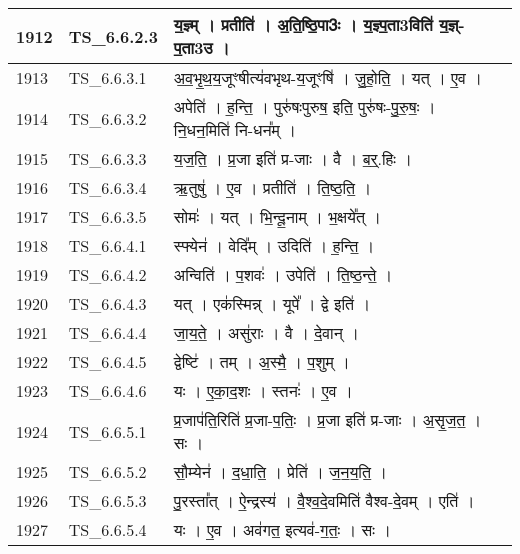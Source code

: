 \documentclass[17pt]{extarticle}
\begin{document}
\begin{longtable}{||p{0.4in}||p{0.9in}||p{4.0in}||p{0.9in}||}
        \hline
            1912 & TS\_6.6.2.3 & य॒ज्ञ्म्   ।   प्रतीति॑   ।   अ॒ति॒ष्ठि॒पा3ः   ।   य॒ज्ञ्प॒ता3विति॑ य॒ज्ञ्{-}प॒ता3उ   ।    &      \\
        \hline
            1913 & TS\_6.6.3.1 & अ॒व॒भृ॒थ॒य॒जूꣳषीत्य॑वभृथ{-}य॒जूꣳषि॑   ।   जु॒हो॒ति॒   ।   यत्   ।   ए॒व   ।    &      \\
        \hline
            1914 & TS\_6.6.3.2 & अपेति॑   ।   ह॒न्ति॒   ।   पुरु॑षःपुरुष॒ इति॒ पुरु॑षः{-}पु॒रु॒षः॒   ।   नि॒धन॒मिति॑ नि{-}धन᳚म्   ।    &      \\
        \hline
            1915 & TS\_6.6.3.3 & य॒ज॒ति॒   ।   प्र॒जा इति॑ प्र{-}जाः   ।   वै   ।   ब॒र्॒.हिः   ।    &      \\
        \hline
            1916 & TS\_6.6.3.4 & ऋ॒तुषु॑   ।   ए॒व   ।   प्रतीति॑   ।   ति॒ष्ठ॒ति॒   ।    &      \\
        \hline
            1917 & TS\_6.6.3.5 & सोमः॑   ।   यत्   ।   भि॒न्दू॒नाम्   ।   भ॒क्षये᳚त्   ।    &      \\
        \hline
            1918 & TS\_6.6.4.1 & स्फ्येन॑   ।   वेदि᳚म्   ।   उदिति॑   ।   ह॒न्ति॒   ।    &      \\
        \hline
            1919 & TS\_6.6.4.2 & अन्विति॑   ।   प॒शवः॑   ।   उपेति॑   ।   ति॒ष्ठ॒न्ते॒   ।    &      \\
        \hline
            1920 & TS\_6.6.4.3 & यत्   ।   एक॑स्मिन्न्   ।   यूपे᳚   ।   द्वे इति॑   ।    &      \\
        \hline
            1921 & TS\_6.6.4.4 & जा॒य॒ते॒   ।   असु॑राः   ।   वै   ।   दे॒वान्   ।    &      \\
        \hline
            1922 & TS\_6.6.4.5 & द्वेष्टि॑   ।   तम्   ।   अ॒स्मै॒   ।   प॒शुम्   ।    &      \\
        \hline
            1923 & TS\_6.6.4.6 & यः   ।   ए॒का॒द॒शः   ।   स्तनः॑   ।   ए॒व   ।    &      \\
        \hline
            1924 & TS\_6.6.5.1 & प्र॒जाप॑ति॒रिति॑ प्र॒जा{-}प॒तिः॒   ।   प्र॒जा इति॑ प्र{-}जाः   ।   अ॒सृ॒ज॒त॒   ।   सः   ।    &      \\
        \hline
            1925 & TS\_6.6.5.2 & सौ॒म्येन॑   ।   द॒धा॒ति॒   ।   प्रेति॑   ।   ज॒न॒य॒ति॒   ।    &      \\
        \hline
            1926 & TS\_6.6.5.3 & पु॒रस्ता᳚त्   ।   ऐ॒न्द्रस्य॑   ।   वै॒श्व॒दे॒वमिति॑ वैश्व{-}दे॒वम्   ।   एति॑   ।    &      \\
        \hline
            1927 & TS\_6.6.5.4 & यः   ।   ए॒व   ।   अव॑गत॒ इत्यव॑{-}ग॒तः॒   ।   सः   ।    &      \\

\end{longtable}
\end{document}
